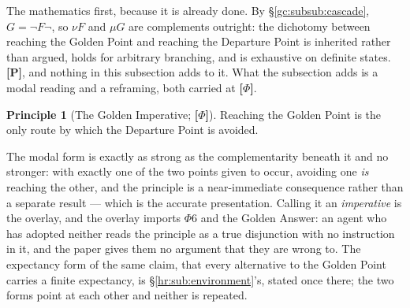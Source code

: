 \documentclass[11pt]{article}
\numberwithin{equation}{section}
\theoremstyle{plain}
\theoremstyle{definition}
\newtheorem{principle}{Principle}
\theoremstyle{remark}
\begin{document}
The mathematics first, because it is already done. By \S\ref{gc:subsub:cascade}, $G = \neg F \neg$, so $\nu F$ and $\mu G$ are complements outright: the dichotomy between reaching the Golden Point and reaching the Departure Point is inherited rather than argued, holds for arbitrary branching, and is exhaustive on definite states. \textbf{[P]}, and nothing in this subsection adds to it. What the subsection adds is a modal reading and a reframing, both carried at \textbf{[$\Phi$]}.

\begin{principle}[The Golden Imperative; \textbf{[$\Phi$]}]\label{ac:prin:imperative}
Reaching the Golden Point is the only route by which the Departure Point is avoided.
\end{principle}

The modal form is exactly as strong as the complementarity beneath it and no stronger: with exactly one of the two points given to occur, avoiding one \emph{is} reaching the other, and the principle is a near-immediate consequence rather than a separate result --- which is the accurate presentation. Calling it an \emph{imperative} is the overlay, and the overlay imports $\Phi6$ and the Golden Answer: an agent who has adopted neither reads the principle as a true disjunction with no instruction in it, and the paper gives them no argument that they are wrong to. The expectancy form of the same claim, that every alternative to the Golden Point carries a finite expectancy, is \S\ref{hr:sub:environment}'s, stated once there; the two forms point at each other and neither is repeated.
\end{document}
